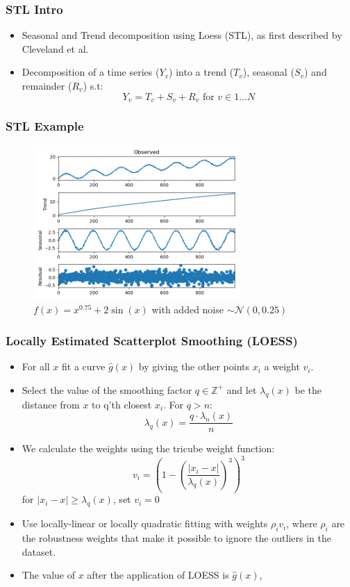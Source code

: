 \documentclass[presentation.tex]{subfiles}
\begin{document}
\begin{frame}
\frametitle{STL Intro}
\begin{itemize}
\item Seasonal and Trend decomposition using Loess (STL), as first described by Cleveland et al.
\item Decomposition of a time series ($Y_v$) into a trend ($T_v$), seasonal ($S_v$) and remainder
  ($R_v$) s.t:
  \[
  Y_v = T_v + S_v + R_v \text{ for } v \in 1 \hdots N
  \]
\end{itemize}
\end{frame}

\begin{frame}
  \frametitle{STL Example}
  \begin{figure}[H]
    \centering
    \includegraphics[width=0.7\textwidth]{imgs/stl1.png}
    \caption{$f(x) = x^{0.75} + 2\sin(x)$ with added noise
      $\sim \mathcal{N}(0, 0.25)$}
  \end{figure}
  \centering
\end{frame}


\begin{frame}
\frametitle{Locally Estimated Scatterplot Smoothing (LOESS)}
\begin{itemize}
  \item For all $x$ fit a curve $\hat{g}(x)$ by giving the other points $x_i$ a
  weight $v_i$.
\item Select the value of the smoothing factor $q \in \mathbb{Z}^+$ and let
  $\lambda_q(x)$ be the distance from $x$ to q'th closest $x_i$. For $q > n$:
  \[
  \lambda_q(x) = \frac{q \cdot \lambda_n(x)}{n}
  \]
\item We calculate the weights using the tricube weight function:
  \[
  v_i = \left( 1 - \left( \frac{| x_i - x |}{\lambda_q(x)}  \right)^3\right)^3
  \]
  for $| x_i - x | \geq \lambda_q(x)$, set $v_i = 0$
\item Use locally-linear or locally quadratic fitting with weights
  $\rho_i v_i$, where $\rho_i$ are the robustness weights that make it possible to 
  ignore the outliers in the dataset.
\item The value of $x$ after the application of LOESS is $\hat{g}(x)$,
\end{itemize}
\end{frame}
\end{document}
